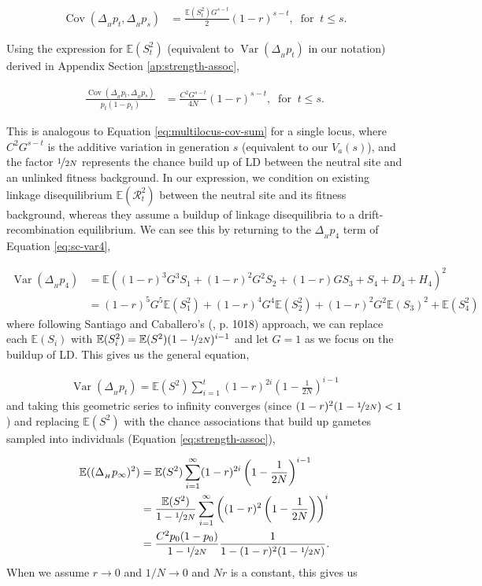 \documentclass[11pt]{article}
\newcommand{\E}{\mathbb{E}}
\DeclareMathOperator{\var}{Var}
\DeclareMathOperator{\cov}{Cov}
\begin{document}
\begin{align}
  \cov(\Delta_{_H} p_t, \Delta_{_H} p_s) &= \frac{\E(S_t^2)G^{s-t}}{2}  (1-r)^{s - t}, \; \; \text{for} \; \; t \le s.
\end{align}

Using the expression for $\E(S_t^2)$ (equivalent to $\var(\Delta_{_H} p_t)$ in
our notation) derived in Appendix Section \ref{ap:strength-assoc}, 

\begin{align}
  \frac{\cov(\Delta_{_H} p_t, \Delta_{_H} p_s)}{p_t(1-p_t)} &= \frac{C^2 G^{s-t}}{4N}  (1-r)^{s - t}, \; \; \text{for} \; \; t \le s.
\end{align}

This is analogous to Equation \eqref{eq:multilocus-cov-sum} for a single
locus, where $C^2 G^{s-t}$ is the additive variation in generation $s$
(equivalent to our $V_a(s)$), and the factor $\nicefrac{1}{2N}$ represents the
chance build up of LD between the neutral site and an unlinked fitness background.
In our expression, we condition on existing linkage disequilibrium $\E(\mathcal{R}_t^2)$
between the neutral site and its fitness background, whereas they assume a
buildup of linkage disequilibria to a drift-recombination equilibrium. We can
see this by returning to the $\Delta_{_H} p_4$ term of Equation
\eqref{eq:sc-var4},

\begin{align}
  \var(\Delta_{_H} p_4) &= \E\left( (1-r)^3 G^3 S_1 + (1-r)^2 G^2 S_2 + (1-r) G S_3 + S_4 + D_4 + H_4\right)^2  \\
                        &= (1-r)^5 G^5 \E(S_1^2) + (1-r)^4 G^4 \E(S_2^2) + (1-r)^2 G^2 \E(S_3)^2 + \E(S_4^2) 
\end{align}
%
where following Santiago and Caballero's (\citeyear{Santiago1995-hx}, p. 1018)
approach, we can replace each $\E(S_i)$ with $\E(S_i^2) =
\E(S^2)(1-\nicefrac{1}{2N})^{i-1}$ and let $G=1$ as we focus on the buildup of
LD. This gives us the general equation, 

\begin{align}
  \var(\Delta_{_H} p_t) = \E(S^2) \sum_{i=1}^t (1-r)^{2i} \left(1-\frac{1}{2N}\right)^{i-1}
\end{align}
%
and taking this geometric series to infinity converges (since $(1-r)^2
(1-\nicefrac{1}{2N}) < 1$) and replacing $\E(S^2)$ with the chance associations
that build up gametes sampled into individuals (Equation
\eqref{eq:strength-assoc}),

\begin{align}
  \E((\Delta_{_H} p_\infty)^2) &= \E(S^2) \sum_{i=1}^\infty (1-r)^{2i} \left(1-\frac{1}{2N}\right)^{i-1} \nonumber \\
                             &= \frac{\E(S^2)}{1-\nicefrac{1}{2N}} \sum_{i=1}^\infty \left((1-r)^2 \left(1-\frac{1}{2N}\right)\right)^{i} \nonumber \\
                             &= \frac{C^2 p_0(1-p_0)}{1-\nicefrac{1}{2N}} \frac{1}{1-(1-r)^2 (1-\nicefrac{1}{2N})}.
\end{align}
% 
When we assume $r \to 0$ and $1/N \to 0$ and $Nr$ is a constant, this gives us
\end{document}
